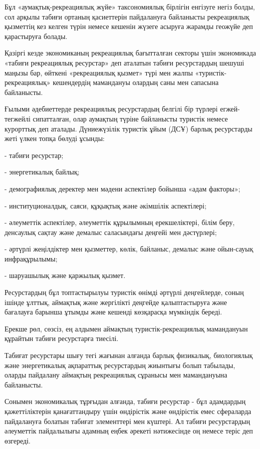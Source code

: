 Бұл «аумақтық-рекреациялық жүйе» таксономиялық бірлігін енгізуге негіз
болды, сол арқылы табиғи ортаның қасиеттерін пайдалануға байланысты
рекреациялық қызметтің кез келген түрін немесе кешенін жүзеге асыруға
жарамды геожүйе деп қарастыруға болады.

Қазіргі кезде экономиканың рекреациялық бағытталған секторы үшін
экономикада «табиғи рекреациялық ресурстар» деп аталатын табиғи
ресурстардың шешуші маңызы бар, өйткені «рекреациялық қызмет» түрі мен
жалпы «туристік-рекреациялық» кешендердің мамандануы олардың саны мен
сапасына байланысты.

Ғылыми әдебиеттерде рекреациялық ресурстардың белгілі бір түрлері
егжей-тегжейлі сипатталған, олар аумақтың түріне байланысты туристік
немесе курорттық деп аталады. Дүниежүзілік туристік ұйым (ДСҰ) барлық
ресурстарды жеті үлкен топқа бөлуді ұсынды:

- табиғи ресурстар;

- энергетикалық байлық;

- демографиялық деректер мен мәдени аспектілер бойынша «адам факторы»;

- институционалдық, саяси, құқықтық және әкімшілік аспектілері;

- әлеуметтік аспектілер, әлеуметтік құрылымның ерекшеліктері, білім
беру, денсаулық сақтау және демалыс саласындағы деңгейі мен дәстүрлері;

- әртүрлі жеңілдіктер мен қызметтер, көлік, байланыс, демалыс және
ойын-сауық инфрақұрылымы;

- шаруашылық және қаржылық қызмет.

Ресурстардың бұл топтастырылуы туристік өнімді әртүрлі деңгейлерде,
соның ішінде ұлттық, аймақтық және жергілікті деңгейде қалыптастыруға
және бағалауға барынша ұтымды және кешенді көзқарасқа мүмкіндік береді.

Ерекше рөл, сөзсіз, ең алдымен аймақтың туристік-рекреациялық
мамандануын құрайтын табиғи ресурстарға тиесілі.

Табиғат ресурстары шығу тегі жағынан алғанда барлық физикалық,
биологиялық және энергетикалық ақпараттық ресурстардың жиынтығы болып
табылады, оларды пайдалану аймақтың рекреациялық сұранысы мен
мамандануына байланысты.

Сонымен экономикалық тұрғыдан алғанда, табиғи ресурстар - бұл адамдардың
қажеттіліктерін қанағаттандыру үшін өндірістік және өндірістік емес
сфераларда пайдалануға болатын табиғат элементтері мен күштері. Ал
табиғи ресурстардың әлеуметтік пайдалылығы адамның еңбек әрекеті
нәтижесінде оң немесе теріс деп өзгереді.

